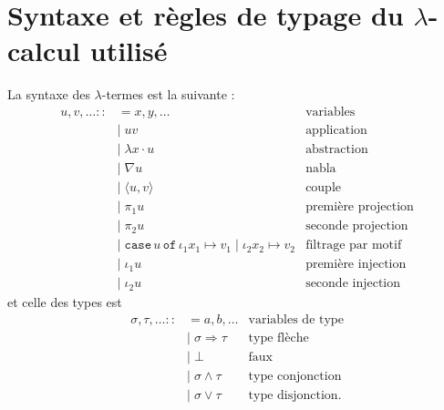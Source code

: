 \documentclass[a4paper]{article}
\theoremstyle{remark}
\theoremstyle{remark}
\theoremstyle{remark}
\theoremstyle{definition}
\theoremstyle{definition}
\theoremstyle{definition}
\begin{document}
\section{Syntaxe et règles de typage du $\lambda$-calcul utilisé}

La syntaxe des $\lambda$-termes est la suivante :
\begin{align*}
u, v, \ldots ::&= x, y, \ldots & \text{variables}\\
&| \; uv & \text{application} \\
&| \; \lambda x \cdot u & \text{abstraction} \\
&| \; \nabla u & \text{nabla} \\
&| \; \langle u, v \rangle & \text{couple} \\
&| \; \pi_1 u & \text{première projection} \\
&| \; \pi_2 u & \text{seconde projection} \\
&| \; \mathtt{case} \, u \, \mathtt{of} \, \iota_1 x_1 \mapsto v_1 \; | \; \iota_2 x_2 \mapsto v_2 & \text{filtrage par motif} \\
&| \; \iota_1 u & \text{première injection} \\
&| \; \iota_2 u & \text{seconde injection}
\end{align*} et celle des types est \begin{align*}
\sigma, \tau, \ldots ::&= a, b, \ldots & \text{variables de type} \\
&| \; \sigma \Rightarrow \tau & \text{type flèche} \\
&| \; \bot & \text{faux} \\
&| \; \sigma \wedge \tau & \text{type conjonction} \\
&| \; \sigma \vee \tau & \text{type disjonction}.
\end{align*}
\end{document}
